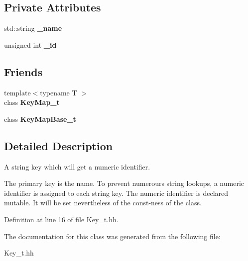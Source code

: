 \subsection*{Private Attributes}
\begin{DoxyCompactItemize}
\item 
std\-::string {\bfseries \-\_\-name}\label{classhistmgr_1_1Key__t_a3ef2f7aa7639d24c9c94389a7e08cc52}

\item 
unsigned int {\bfseries \-\_\-id}\label{classhistmgr_1_1Key__t_a6bd85027f8ed355208f46dbbfbc314df}

\end{DoxyCompactItemize}
\subsection*{Friends}
\begin{DoxyCompactItemize}
\item 
{\footnotesize template$<$typename T $>$ }\\class {\bfseries Key\-Map\-\_\-t}\label{classhistmgr_1_1Key__t_ac6e344ee1199919f6cdaa7f11ab5ac9d}

\item 
class {\bfseries Key\-Map\-Base\-\_\-t}\label{classhistmgr_1_1Key__t_a9575e83b8b317dbc46a599683d98e086}

\end{DoxyCompactItemize}


\subsection{Detailed Description}
A string key which will get a numeric identifier. 

The primary key is the name. To prevent numerours string lookups, a numeric identifier is assigned to each string key. The numeric identifier is declared mutable. It will be set nevertheless of the const-\/ness of the class. 

Definition at line 16 of file Key\-\_\-t.\-hh.



The documentation for this class was generated from the following file\-:\begin{DoxyCompactItemize}
\item 
Key\-\_\-t.\-hh\end{DoxyCompactItemize}
